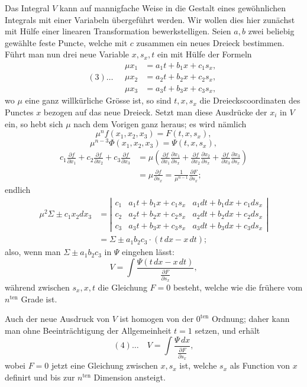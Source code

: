 \documentclass[10pt]{article}
\begin{document}
Das Integral $V$ kann auf mannigfache Weise in die Gestalt eines gewöhnlichen Integrals mit einer Variabeln übergeführt werden. Wir wollen dies hier zunächst mit Hülfe einer linearen Transformation bewerkstelligen. Seien $a,b$ zwei beliebig gewählte feste Puncte, welche mit $c$ zusammen ein neues Dreieck bestimmen. Führt man nun drei neue Variable $x,s_x,t$ ein mit Hülfe der Formeln
\[
(3)\ldots\quad
\begin{aligned}
\mu x_1&=a_1t+b_1x+c_1s_x,\\
\mu x_2&=a_2t+b_2x+c_2s_x,\\
\mu x_3&=a_3t+b_3x+c_3s_x,
\end{aligned}
\]
wo $\mu$ eine ganz willkürliche Grösse ist, so sind $t,x,s_x$ die Dreieckscoordinaten des Punctes $x$ bezogen auf das neue Dreieck. Setzt man diese Ausdrücke der $x_i$ in $V$ ein, so hebt sich $\mu$ nach dem Vorigen ganz heraus; es wird nämlich
\[
\mu^n f(x_1,x_2,x_3)=F(t,x,s_x),
\]
\[
\mu^{n-3}\Phi(x_1,x_2,x_3)=\Psi(t,x,s_x),
\]
\[
\begin{aligned}
c_1\frac{\partial f}{\partial x_1}+c_2\frac{\partial f}{\partial x_2}+c_3\frac{\partial f}{\partial x_3}
&=\mu\left(\frac{\partial f}{\partial x_1}\frac{\partial x_1}{\partial s_x}+\frac{\partial f}{\partial x_2}\frac{\partial x_2}{\partial s_x}+\frac{\partial f}{\partial x_3}\frac{\partial x_3}{\partial s_x}\right)\\
&=\mu\frac{\partial f}{\partial s_x}=\frac{1}{\mu^{n-1}}\frac{\partial F}{\partial s_x};
\end{aligned}
\]
endlich
\[
\begin{aligned}
\mu^2\Sigma\pm c_1x_2dx_3&=\left|\begin{array}{ccc}
c_1&a_1t+b_1x+c_1s_x&a_1dt+b_1dx+c_1ds_x\\
c_2&a_2t+b_2x+c_2s_x&a_2dt+b_2dx+c_2ds_x\\
c_3&a_3t+b_3x+c_3s_x&a_3dt+b_3dx+c_3ds_x
\end{array}\right|\\
&=\Sigma\pm a_1b_2c_3\cdot(t\,dx-x\,dt);
\end{aligned}
\]
also, wenn man $\Sigma\pm a_1b_2c_3$ in $\Psi$ eingehen lässt:
\[
V=\int\frac{\Psi(t\,dx-x\,dt)}{\frac{\partial F}{\partial s_x}},
\]
während zwischen $s_x,x,t$ die Gleichung $F=0$ besteht, welche wie die frühere vom $n^{\mathrm{ten}}$ Grade ist.

Auch der neue Ausdruck von $V$ ist homogen von der $0^{\mathrm{ten}}$ Ordnung; daher kann man ohne Beeinträchtigung der Allgemeinheit $t=1$ setzen, und erhält
\[
(4)\ldots\quad V=\int\frac{\Psi\,dx}{\frac{\partial F}{\partial s_x}},
\]
wobei $F=0$ jetzt eine Gleichung zwischen $x,s_x$ ist, welche $s_x$ als Function von $x$ definirt und bis zur $n^{\mathrm{ten}}$ Dimension ansteigt.
\end{document}
